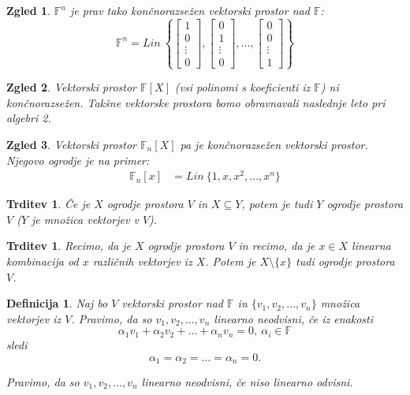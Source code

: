 \documentclass[10pt, a4paper]{article}
\newtheorem{trditev}[izr]{Trditev}
\newtheorem{defi}{Definicija}[section]
\newenvironment{noticeB}{%
  \tcolorbox[%
  notitle,
  empty,
  enhanced,  %
  breakable,
  coltext=black,
  colback=white, 
  fontupper=\rmfamily,
  parbox=false,
  noparskip,
  sharp corners,
  boxrule=-1pt,  %
  frame hidden,
  left=7pt,  %
  right=7pt,
  top=5pt,
  bottom=5pt,
  before skip=2.5ex plus 2pt,
  after skip=2.5ex plus 2pt,
  borderline west = {1.5pt}{-0.1pt}{blue!30!black}, %
  overlay unbroken and last={%
    \draw[color=black, line width=1.25pt]
    ($(frame.south west)+(1.pt, -0.1pt)$) -- ++(2em, 0);
  }
  ]}
{\endtcolorbox}
\newenvironment{definicija}{\begin{defi}\begin{noticeB}}{%
    \end{noticeB}\end{defi}}
\newtheorem{zgled}{Zgled}[section]
\newcommand{\F}{\mathbb {F}}
\begin{document}
\begin{zgled}
    $\F^n$ je prav tako končnorazsežen vektorski prostor nad $\F$:
    $$\F^n = Lin\ \left\lbrace \begin{bmatrix}
        1\\ 0 \\ \vdots\\ 0 
    \end{bmatrix}, \begin{bmatrix}
        0\\ 1\\ \vdots\\ 0
    \end{bmatrix}, \dots, \begin{bmatrix}
        0\\ 0\\ \vdots\\ 1
    \end{bmatrix} \right\rbrace$$
\end{zgled}

\begin{zgled}
    Vektorski prostor $\F[X]$ (vsi polinomi s koeficienti iz $\F$) ni končnorazsežen. 
    Takšne vektorske prostora bomo obravnavali naslednje leto pri algebri 2.
\end{zgled}

\begin{zgled}
    Vektorski prostor $\F_n [X]$ pa je končnorazsežen vektorski prostor. Njegovo ogrodje je na primer:
    \begin{align*}
        \F_n [x] &= Lin\ \lbrace 1, x, x^2, \dots, x^n \rbrace 
    \end{align*}
\end{zgled}

\begin{trditev}
    Če je $X$ ogrodje prostora $V$ in $X \subseteq Y$, potem je tudi $Y$ ogrodje prostora $V$ ($Y$ je množica vektorjev v $V$).
\end{trditev}

\begin{trditev}
    Recimo, da je $X$ ogrodje prostora $V$ in recimo, da je $x \in X$ linearna kombinacija od $x$ različnih vektorjev iz $X$. Potem je $X \setminus \{x\}$ tudi ogrodje prostora $V$. 
\end{trditev}

\begin{definicija}
    Naj bo $V$ vektorski prostor nad $\F$ in $\{v_1, v_2, \dots, v_n\}$ množica vektorjev iz $V$. Pravimo, da so $v_1, v_2, \dots, v_n$ linearno neodvisni, če iz enakosti
    $$\alpha_1 v_1 + \alpha_2 v_2 + \dots + \alpha_n v_n = 0,\ \alpha_i \in \F$$ sledi $$\alpha_1 = \alpha_2 = \dots = \alpha_n = 0.$$

    Pravimo, da so $v_1, v_2, \dots, v_n$ linearno neodvisni, če niso linearno odvisni.
\end{definicija}
\end{document}
